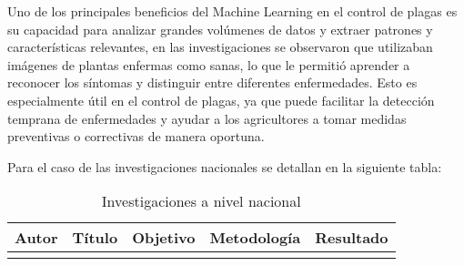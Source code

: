 Uno de los principales beneficios del Machine Learning en el control de plagas es su capacidad para analizar grandes volúmenes de datos y extraer patrones y características relevantes, en las investigaciones se observaron que utilizaban imágenes  de plantas enfermas como sanas, lo que le permitió aprender a reconocer los síntomas y distinguir entre diferentes enfermedades. Esto es especialmente útil en el control de plagas, ya que puede facilitar la detección temprana de enfermedades y ayudar a los agricultores a tomar medidas preventivas o correctivas de manera oportuna.

Para el caso de las investigaciones nacionales se detallan en la siguiente tabla:


\begin{longtable}{|p{2cm}|p{3cm}|p{3cm}|p{4cm}|p{3cm}|}

\caption{Investigaciones a nivel nacional}\\
\hline
\textbf{Autor} & \textbf{Título} & \textbf{Objetivo} & \textbf{Metodología} & \textbf{Resultado} \\
\hline
\endhead

\hline
\endfoot

\hline
\endlastfoot


\end{longtable}
